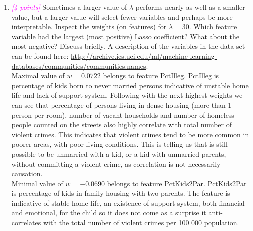 \documentclass{article}
\newcommand{\1}{\mathbf{1}}
\newcommand{\points}[1]{\small\textcolor{magenta}{\emph{[#1 points]}} \normalsize}
\begin{document}
\begin{enumerate}
    \newpage
    \item \points{4} Sometimes a larger value of $\lambda$ performs nearly as well as a smaller value, but a larger value will select fewer variables and perhaps be more interpretable. Inspect the weights (on features) for $\lambda = 30$. Which feature variable had the largest (most positive) Lasso coefficient? What about the most negative? Discuss briefly. A description of the variables in the data set can be found here: \url{http://archive.ics.uci.edu/ml/machine-learning-databases/communities/communities.names}. \\
    
    Maximal value of $w=0.0722$ belongs to feature PctIlleg. PctIlleg is percentage of kids born to never married persons indicative of unstable home life and lack of support system. Following with the next highest weights we can see that percentage of persons living in dense housing (more than 1 person per room), number of vacant households and number of homeless people counted on the streets also highly correlate with total number of violent crimes. This indicates that violent crimes tend to be more common in poorer areas, with poor living conditions. This is telling us that is still possible to be unmarried with a kid, or a kid with unmarried parents, without committing a violent crime, as correlation is not necessarily causation.  \\
    Minimal value of $w=-0.0690$ belongs to feature PctKids2Par. PctKids2Par is percentage of kids in family housing with two parents. The feature is indicative of stable home life, an existence of support system, both financial and emotional, for the child so it does not come as a surprise it anti-correlates with the total number of violent crimes per 100 000 population. 


\end{enumerate}
\end{document}
